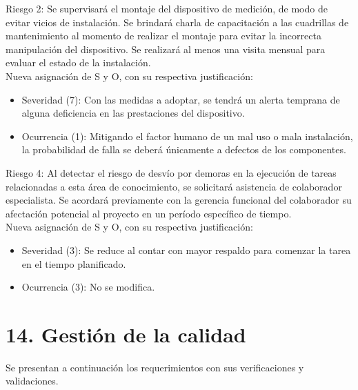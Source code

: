 \documentclass[
11pt, %
]{charter}
\begin{document}
Riesgo 2: Se supervisará el montaje del dispositivo de medición, de modo de evitar vicios de instalación. Se brindará charla de capacitación a las cuadrillas de mantenimiento al momento de realizar el montaje para evitar la incorrecta manipulación del dispositivo. Se realizará al menos una visita mensual para evaluar el estado de la instalación.\\
Nueva asignación de S y O, con su respectiva justificación:
\begin{itemize}
	\item Severidad (7): Con las medidas a adoptar, se tendrá un alerta temprana de alguna deficiencia en las prestaciones del dispositivo.
	\item Ocurrencia (1): Mitigando el factor humano de un mal uso o mala instalación, la probabilidad de falla se deberá únicamente a defectos de los componentes.
\end{itemize}
 
Riesgo 4: Al detectar el riesgo de desvío por demoras en la ejecución de tareas relacionadas a esta área de conocimiento, se solicitará asistencia de colaborador especialista. Se acordará previamente con la gerencia funcional del colaborador su afectación potencial al proyecto en un período específico de tiempo.\\
  Nueva asignación de S y O, con su respectiva justificación:
\begin{itemize}
	\item Severidad (3): Se reduce al contar con mayor respaldo para comenzar la tarea en el tiempo planificado.
	\item Ocurrencia (3): No se modifica.
\end{itemize}
 


\section{14. Gestión de la calidad}
\label{sec:calidad}

Se presentan a continuación los requerimientos con sus verificaciones y validaciones.

%
\end{document}
